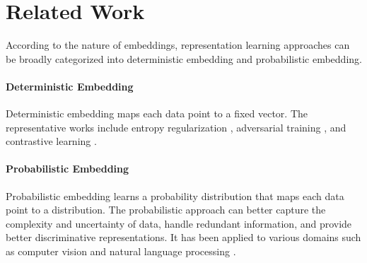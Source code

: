 \documentclass[letterpaper]{article} %
\begin{document}
\section{Related Work}
According to the nature of embeddings, representation learning approaches can be broadly categorized into deterministic embedding and probabilistic embedding.

\paragraph{Deterministic Embedding}
Deterministic embedding maps each data point to a fixed vector. The representative works include entropy regularization \citep{DBLP:conf/iclr/PereyraTCKH17}, adversarial training \citep{DBLP:conf/iclr/MiyatoDG17}, and contrastive learning \citep{gunel2020supervised,DBLP:conf/acl/0001BWZH23}.

\paragraph{Probabilistic Embedding}
Probabilistic embedding \cite{DBLP:journals/corr/VilnisM14} learns a probability distribution that maps each data point to a distribution. The probabilistic approach can better capture the complexity and uncertainty of data, handle redundant information, and provide better discriminative representations. It has been applied to various domains such as computer vision \cite{DBLP:conf/iclr/OhMPRSG19,DBLP:conf/iccv/ShiJ19,chang2020data,DBLP:conf/iclr/RameC21} and natural language processing \cite{DBLP:conf/iclr/MahabadiBH21,DBLP:conf/iclr/WangWCGJLL21,DBLP:conf/emnlp/0001HDZJMS22}.
\end{document}
